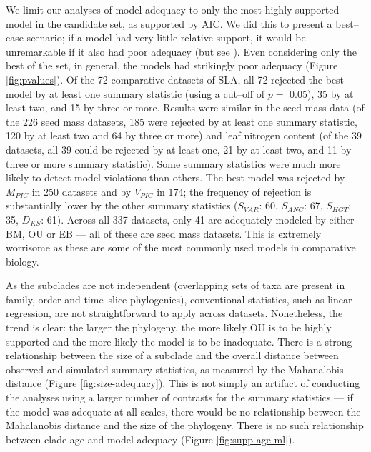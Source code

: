 \documentclass[a4paper,12pt]{article}
\begin{document}
We limit our analyses of model adequacy to only the most highly supported model in the candidate set, as supported by AIC. We did this to present a best--case scenario; if a model had very little relative support, it would be unremarkable if it also had poor adequacy (but see \citep{Ripplinger2010}). Even considering only the best of the set, in general, the models had strikingly poor adequacy (Figure \ref{fig:pvalues}). 
Of the 72 comparative datasets of SLA, all 72 rejected the best model by at least one summary statistic (using a cut--off of $p=$ 0.05), 35 by at least two, and 15 by three or more. 
Results were similar in the seed mass data (of the 226 seed mass datasets, 185 were rejected by at least one summary statistic, 120 by at least two and 64 by three or more) and leaf nitrogen content 
(of the 39 datasets, all 39 could be rejected by at least one, 21 by at least two, and 11 by three or more summary statistic). 
Some summary statistics were much more likely to detect model violations than others. The best model was rejected by $M_{PIC}$ in 250 datasets and by $V_{PIC}$ in 174; the frequency of rejection is substantially lower by the other summary statistics ($S_{VAR}$: 60, $S_{ANC}$: 67, $S_{HGT}$: 35, $D_{KS}$: 61).
Across all 337 datasets, only 41 are adequately modeled by either BM, OU or EB --- all of these are seed mass datasets. This is extremely worrisome as these are some of the most commonly used models in comparative biology. 

As the subclades are not independent (overlapping sets of taxa are present in family, order and time--slice phylogenies), conventional statistics, such as linear regression, are not straightforward to apply across datasets. Nonetheless, the trend is clear: the larger the phylogeny, the more likely OU is to be highly supported and the more likely the model is to be inadequate. There is a strong relationship between the size of a subclade and the overall distance between observed and simulated summary statistics, as measured by the Mahanalobis distance (Figure \ref{fig:size-adequacy}). This is not simply an artifact of conducting the analyses using a larger number of contrasts for the summary statistics --- if the model was adequate at all scales, there would be no relationship between the Mahalanobis distance and the size of the phylogeny. There is no such relationship between clade age and model adequacy (Figure \ref{fig:supp-age-ml}).
\end{document}
